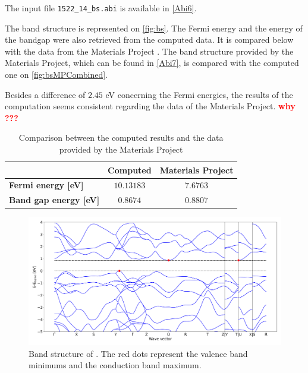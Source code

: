 \documentclass[11pt,a4paper]{article}
\begin{document}
The input file \texttt{1522\_14\_bs.abi} is available in \autoref{Abi6}. 



The band structure is represented on \autoref{fig:bs}. The Fermi energy and the energy of the bandgap were also retrieved from the computed data. It is compared below with the data from the Materials Project \cite{MaterialsProject}. The band structure provided by the Materials Project, which can be found in \autoref{Abi7}, is compared with the computed one on \autoref{fig:bsMPCombined}.

Besides a difference of $2.45$ eV concerning the Fermi energies, the results of the computation seems consistent regarding the data of the Materials Project. \textbf{\textcolor{red}{why ???}}
\begin{table}
\centering
\begin{tabular}{|l|c|c|}
\cline{2-3}
\multicolumn{1}{l|}{}&\textbf{Computed}&\textbf{Materials Project}\\
\hline 
\textbf{Fermi energy [eV]}& $10.13183$&$7.6763$\\
\hline
\textbf{Band gap energy [eV]} & $0.8674$ & $0.8807$ \\
\hline
\end{tabular}
\caption{Comparison between the computed results and the data provided by the Materials Project}
\label{tab:bg}
\end{table}
\begin{figure}[h]
\centering
\includegraphics[width=\textwidth]{images/bs.pdf}
\caption{Band structure of . The red dots represent the valence band minimums and the conduction band maximum.}
\label{fig:bs}
\end{figure}
\end{document}
